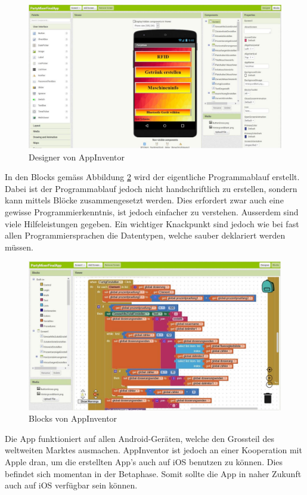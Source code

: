 \begin{figure}[h!]
	\centering
	\includegraphics[width=\textwidth]{graphics/AppInventorDesigner}
	\caption{Designer von AppInventor \cite{appinventor_mit_nodate}}
	\label{fig:AppInventorDesigner}
\end{figure}

In den Blocks gemäss Abbildung \ref{fig:AppInventorBlocks} wird der eigentliche Programmablauf erstellt. Dabei ist der Programmablauf jedoch nicht handschriftlich zu erstellen, sondern kann mittels Blöcke zusammengesetzt werden. Dies erfordert zwar auch eine gewisse Programmierkenntnis, ist jedoch einfacher zu verstehen. Ausserdem sind viele Hilfeleistungen gegeben. Ein wichtiger Knackpunkt sind jedoch wie bei fast allen Programmiersprachen die Datentypen, welche sauber deklariert werden müssen.

\begin{figure}[h!]
	\centering
	\includegraphics[width=\textwidth]{graphics/AppInventorBlocks}
	\caption{Blocks von AppInventor \cite{appinventor_mit_nodate}}
	\label{fig:AppInventorBlocks}
\end{figure}

Die App funktioniert auf allen Android-Geräten, welche den Grossteil des weltweiten Marktes ausmachen. AppInventor ist jedoch an einer Kooperation mit Apple dran, um die erstellten App's auch auf iOS benutzen zu können. Dies befindet sich momentan in der Betaphase. Somit sollte die App in naher Zukunft auch auf iOS verfügbar sein können. \cite{appinventor_mit_nodate-1}




 
